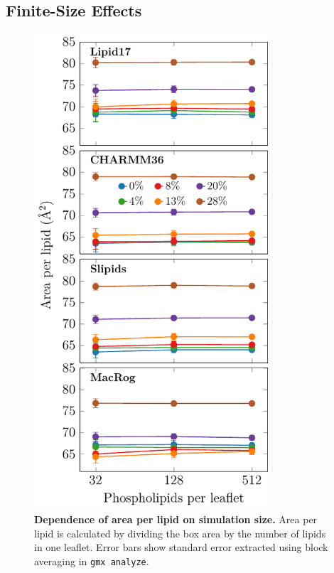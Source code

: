 \documentclass[journal=jpcbfk,manuscript=suppinfo]{achemso}
\begin{document}
\clearpage
\subsection{Finite-Size Effects}

\begin{figure}[htb!]
    \centering
    \includegraphics[width=8.7cm]{../FIGS/apl_vs_size.pdf}
    \caption{\label{SIfig:aplvssize}%
     \textbf{Dependence of area per lipid on simulation size.} Area per lipid is calculated by dividing the box area by the number of lipids in one leaflet. Error bars show standard error extracted using block averaging in \texttt{gmx analyze}.
    }
\end{figure}
\end{document}
